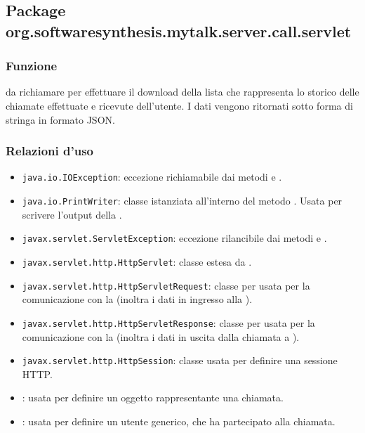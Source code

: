 \subsection{Package org.softwaresynthesis.mytalk.server.call.servlet}\label{sec:callServlet}


\subsubsection*{Funzione}
 da richiamare per effettuare il download della lista che rappresenta lo storico delle chiamate effettuate e ricevute dell'utente. I dati vengono ritornati sotto forma di stringa in formato JSON.

\subsubsection*{Relazioni d'uso}
\begin{itemize}
	\item \texttt{java.io.IOException}: eccezione richiamabile dai metodi  e .
	\item \texttt{java.io.PrintWriter}: classe istanziata all'interno del metodo . Usata per scrivere l'output della .
	\item \texttt{javax.servlet.ServletException}: eccezione rilancibile dai metodi  e .
	\item \texttt{javax.servlet.http.HttpServlet}: classe estesa da .
	\item \texttt{javax.servlet.http.HttpServletRequest}:  classe per usata per la comunicazione con la  (inoltra i dati in ingresso alla ).
	\item \texttt{javax.servlet.http.HttpServletResponse}: classe per usata per la comunicazione con la  (inoltra i dati in uscita dalla chiamata a ).
	\item \texttt{javax.servlet.http.HttpSession}: classe usata per definire una sessione HTTP.
	\item {}: usata per definire un oggetto rappresentante una chiamata.
	\item {}: usata per definire un utente generico, che ha partecipato alla chiamata.
\end{itemize}

